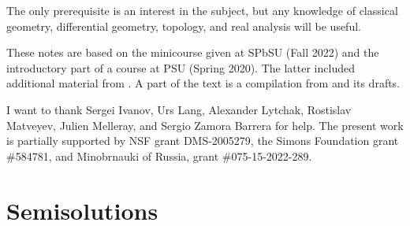 \documentclass[twoside]{book}
\begin{document}
The only prerequisite is an interest in the subject,
but any knowledge of classical geometry, differential geometry, topology, and real analysis will be useful. 

These notes are based on the minicourse given at SPbSU (Fall 2022) and the introductory part of a course at PSU (Spring 2020).
The latter included additional material from \cite{alexander-kapovitch-petrunin-2019,petrunin2020mnfld,nabutovsky}.
A part of the text is a compilation from \cite{alexander-kapovitch-petrunin-2019, alexander-kapovitch-petrunin-2025, petrunin-yashinski, petrunin-2022-PIGTIKAL, petrunin-zamorabarrera} and its drafts.

I want to thank
Sergei Ivanov,
Urs Lang,
Alexander Lytchak,
Rostislav Matveyev,
Julien Melleray,
and Sergio Zamora Barrera for help.
The present work is partially supported by NSF grant DMS-2005279,
the Simons Foundation grant \#584781,
and Minobrnauki of Russia, grant \#075-15-2022-289.

\thispagestyle{empty}
\tableofcontents
\thispagestyle{empty}






%

\backmatter

\chapter{Semisolutions}

{

\footnotesize
\begin{multicols}{2}







\end{multicols}
}


{\small\sloppy


\def\emph{\textit}

\printbibliography[heading=bibintoc]
\fussy
}
\end{document}
